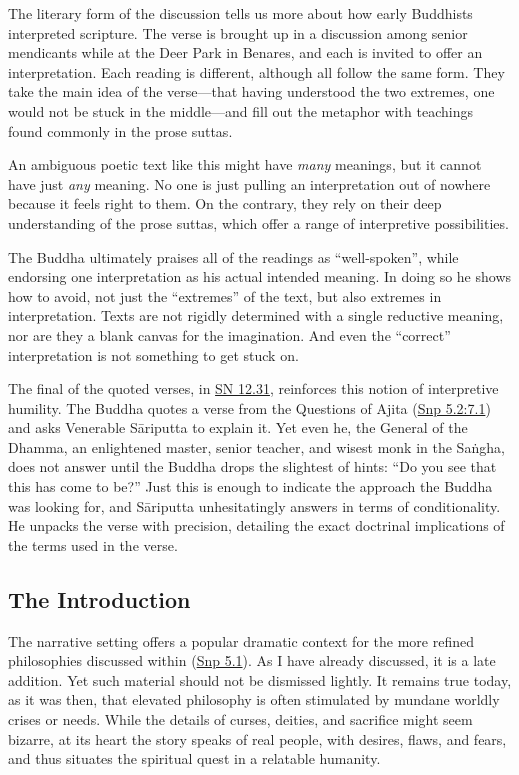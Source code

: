 \documentclass[12pt,openany]{book}%
\begin{document}
The literary form of the discussion tells us more about how early Buddhists interpreted scripture. The verse is brought up in a discussion among senior mendicants while at the Deer Park in Benares, and each is invited to offer an interpretation. Each reading is different, although all follow the same form. They take the main idea of the verse—that having understood the two extremes, one would not be stuck in the middle—and fill out the metaphor with teachings found commonly in the prose suttas.

An ambiguous poetic text like this might have \emph{many} meanings, but it cannot have just \emph{any} meaning. No one is just pulling an interpretation out of nowhere because it feels right to them. On the contrary, they rely on their deep understanding of the prose suttas, which offer a range of interpretive possibilities.

The Buddha ultimately praises all of the readings as “well-spoken”, while endorsing one interpretation as his actual intended meaning. In doing so he shows how to avoid, not just the “extremes” of the text, but also extremes in interpretation. Texts are not rigidly determined with a single reductive meaning, nor are they a blank canvas for the imagination. And even the “correct” interpretation is not something to get stuck on.

The final of the quoted verses, in \href{https://suttacentral.net/sn12.31/en/sujato}{SN 12.31}, reinforces this notion of interpretive humility. The Buddha quotes a verse from the Questions of Ajita (\href{https://suttacentral.net/snp5.2/en/sujato\#7.1}{Snp 5.2:7.1}) and asks Venerable \textsanskrit{Sāriputta} to explain it. Yet even he, the General of the Dhamma, an enlightened master, senior teacher, and wisest monk in the \textsanskrit{Saṅgha}, does not answer until the Buddha drops the slightest of hints: “Do you see that this has come to be?” Just this is enough to indicate the approach the Buddha was looking for, and \textsanskrit{Sāriputta} unhesitatingly answers in terms of conditionality. He unpacks the verse with precision, detailing the exact doctrinal implications of the terms used in the verse.

\subsection*{The Introduction}

The narrative setting offers a popular dramatic context for the more refined philosophies discussed within (\href{https://suttacentral.net/snp5.1/en/sujato}{Snp 5.1}). As I have already discussed, it is a late addition. Yet such material should not be dismissed lightly. It remains true today, as it was then, that elevated philosophy is often stimulated by mundane worldly crises or needs. While the details of curses, deities, and sacrifice might seem bizarre, at its heart the story speaks of real people, with desires, flaws, and fears, and thus situates the spiritual quest in a relatable humanity.
\end{document}
